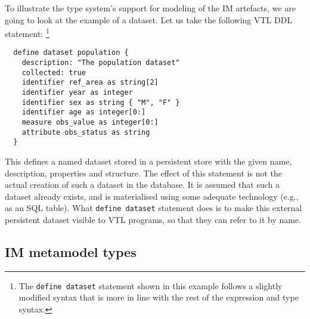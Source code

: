 \documentclass[droidmono,libertine,twoside,user,unofficial]{ecarticle}
\begin{document}
To illustrate the type system's support for modeling of the IM
artefacts, we are going to look at the example of a dataset.  Let us
take the following VTL DDL statement:%
\footnote{The \texttt{define dataset} statement shown in this example
  follows a slightly modified syntax that is more in line with the
  rest of the expression and type syntax.}
\begin{lstlisting}
  define dataset population {
    description: "The population dataset"
    collected: true
    identifier ref_area as string[2]
    identifier year as integer
    identifier sex as string { "M", "F" }
    identifier age as integer[0:]
    measure obs_value as integer[0:]
    attribute obs_status as string
  }
\end{lstlisting}

This defines a named dataset stored in a persistent store with the
given name, description, properties and structure.  The effect of this
statement is not the actual creation of such a dataset in the
database.  It is assumed that such a dataset already exists, and is
materialised using some adequate technology (e.g., as an SQL table).
What \texttt{define dataset} statement does is to make this external
persistent dataset visible to VTL programs, so that they can refer to
it by name.

\subsection{IM metamodel types}
\end{document}
